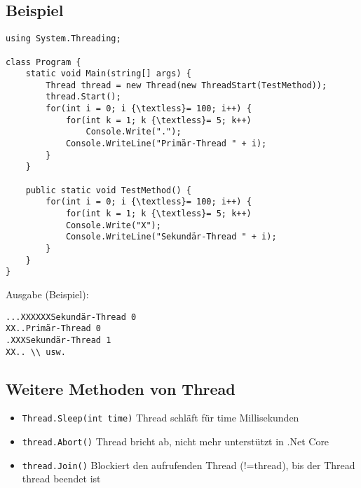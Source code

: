 \subsection{Beispiel}
\begin{lstlisting}[language={[Sharp]C}]
using System.Threading;

class Program {
	static void Main(string[] args) {
		Thread thread = new Thread(new ThreadStart(TestMethod));
		thread.Start();
		for(int i = 0; i {\textless}= 100; i++) {
			for(int k = 1; k {\textless}= 5; k++)
				Console.Write(".");
			Console.WriteLine("Primär-Thread " + i);
		}
	}

	public static void TestMethod() {
		for(int i = 0; i {\textless}= 100; i++) {
			for(int k = 1; k {\textless}= 5; k++)
			Console.Write("X");
			Console.WriteLine("Sekundär-Thread " + i);
		}
	}
}
\end{lstlisting}

Ausgabe (Beispiel):

\begin{lstlisting}[language={[Sharp]C}]
...XXXXXXSekundär-Thread 0
XX..Primär-Thread 0
.XXXSekundär-Thread 1
XX.. \\ usw.
\end{lstlisting}

\subsection{Weitere Methoden von Thread}

\begin{itemize}
\item \lstinline[language={[Sharp]C}]!Thread.Sleep(int time)! Thread schläft für time Millisekunden
\item \lstinline[language={[Sharp]C}]!thread.Abort()! Thread bricht ab, nicht mehr unterstützt in .Net Core
\item \lstinline[language={[Sharp]C}]!thread.Join()! Blockiert den aufrufenden Thread (!=thread), bis der Thread thread beendet ist
\end{itemize}